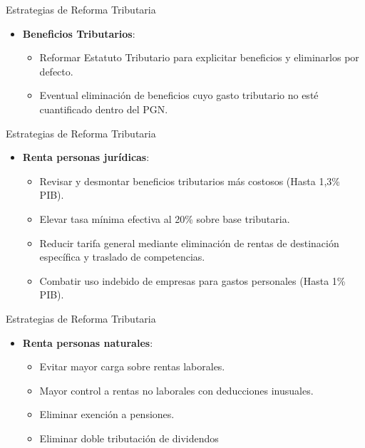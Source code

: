 \begin{frame}{Estrategias de Reforma Tributaria}
\begin{itemize}
    \item \textbf{Beneficios Tributarios}:
    \begin{itemize}
        \item Reformar Estatuto Tributario para explicitar beneficios y eliminarlos por defecto.
        \item Eventual eliminación de beneficios cuyo gasto tributario no esté cuantificado dentro del PGN.
    \end{itemize}
\end{itemize}
\end{frame}

\begin{frame}{Estrategias de Reforma Tributaria}
\begin{itemize}
    \item \textbf{Renta personas jurídicas}:
    \begin{itemize}
        \item Revisar y desmontar beneficios tributarios más costosos (Hasta 1,3\% PIB).
        \item Elevar tasa mínima efectiva al 20\% sobre base tributaria.
        \item Reducir tarifa general mediante eliminación de rentas de destinación específica y traslado de competencias.
        \item Combatir uso indebido de empresas para gastos personales (Hasta 1\% PIB).
    \end{itemize}
\end{itemize}
\end{frame}

\begin{frame}{Estrategias de Reforma Tributaria}
\begin{itemize}    
    \item \textbf{Renta personas naturales}:
    \begin{itemize}
        \item Evitar mayor carga sobre rentas laborales.
        \item Mayor control a rentas no laborales con deducciones inusuales.
        \item Eliminar exención a pensiones.
        \item Eliminar doble tributación de dividendos
    \end{itemize}
\end{itemize}
\end{frame}

